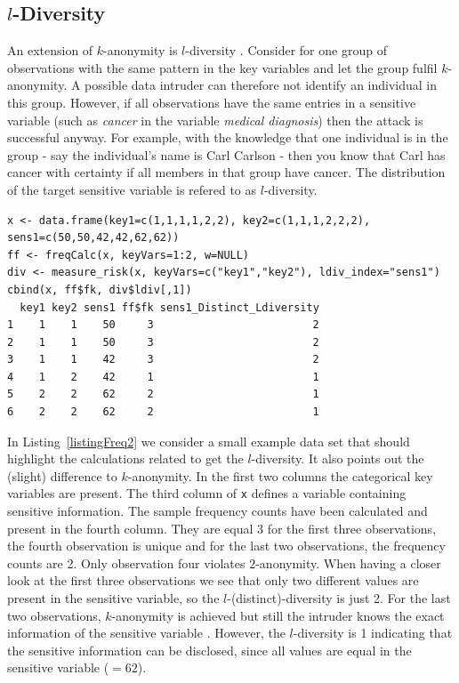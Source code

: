 \documentclass[12pt]{article}
\begin{document}
\subsection{$l$-Diversity}

An extension of $k$-anonymity is $l$-diversity \citep{Machanava07}. 
Consider for one group of observations with the same pattern in the key variables and let the
group fulfil $k$-anonymity. A possible data intruder can therefore not identify an individual 
in this group. However, if all observations have the same entries in a sensitive variable (such as
\textit{cancer} in the variable \textit{medical diagnosis}) then the attack is successful anyway. For example,
with the knowledge that one individual is in the group - say the individual's name is Carl Carlson - 
then you know that Carl has cancer with certainty  if all members in that group have cancer. 
The distribution of the target sensitive variable is refered to as $l$-diversity.

\begin{lstlisting}[captionpos=b, caption={k-anonymity and l-diversity.}, label=listingFreq2]
x <- data.frame(key1=c(1,1,1,1,2,2), key2=c(1,1,1,2,2,2), sens1=c(50,50,42,42,62,62))
ff <- freqCalc(x, keyVars=1:2, w=NULL)
div <- measure_risk(x, keyVars=c("key1","key2"), ldiv_index="sens1")
cbind(x, ff$fk, div$ldiv[,1])
  key1 key2 sens1 ff$fk sens1_Distinct_Ldiversity 
1    1    1    50     3                         2               
2    1    1    50     3                         2               
3    1    1    42     3                         2                
4    1    2    42     1                         1                
5    2    2    62     2                         1               
6    2    2    62     2                         1                
\end{lstlisting}

In Listing~\ref{listingFreq2} we consider a small example data set that should highlight the
calculations related to get the   
$l$-diversity. It also points out the (slight) difference to $k$-anonymity. 
In the first two columns the categorical 
key variables are present. The third column of \texttt{x} defines a variable containing 
sensitive information. The sample frequency counts have been calculated and present in the fourth 
column. They are equal 3 for the first three observations, the fourth observation is unique and for the
last two observations, the frequency counts are 2. Only observation four violates $2$-anonymity. 
When having a closer look at the first three observations
we see that only two different values are present in the sensitive variable, 
so the $l$-(distinct)-diversity is
just 2. For the last two observations, $k$-anonymity is achieved but still the intruder knows the exact information of the sensitive variable
. However, the $l$-diversity is 1 indicating that the sensitive information can be disclosed, since 
all values are equal in 
the sensitive variable ($=62$). 
\end{document}
